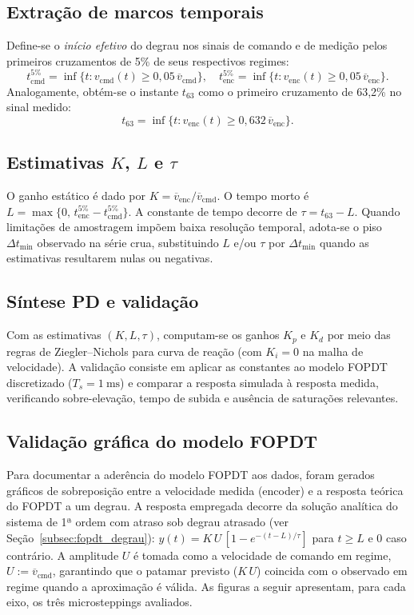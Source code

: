 \subsection{Extração de marcos temporais}\label{subsec:fopdt_marcos}
Define-se o \emph{início efetivo} do degrau nos sinais de comando e de
medição pelos primeiros cruzamentos de 5\% de seus respectivos regimes:
\begin{equation}
    t^{5\%}_{\mathrm{cmd}} = \inf\{ t: v_{\mathrm{cmd}}(t) \ge 0{,}05\,\overline v_{\mathrm{cmd}}\},\quad
    t^{5\%}_{\mathrm{enc}} = \inf\{ t: v_{\mathrm{enc}}(t) \ge 0{,}05\,\overline v_{\mathrm{enc}}\}.
\end{equation}
Analogamente, obtém-se o instante $t_{63}$ como o primeiro cruzamento de
63,2\% no sinal medido:
\begin{equation}
    t_{63} = \inf\{ t: v_{\mathrm{enc}}(t) \ge 0{,}632\,\overline v_{\mathrm{enc}}\}.
\end{equation}

\subsection{Estimativas $K$, $L$ e $\tau$}\label{subsec:fopdt_estimas}
O ganho estático é dado por $K=\overline v_{\mathrm{enc}}/\overline v_{\mathrm{cmd}}$.
O tempo morto é $L = \max\{0,\,t^{5\%}_{\mathrm{enc}} - t^{5\%}_{\mathrm{cmd}}\}$. A constante de
tempo decorre de $\tau = t_{63} - L$. Quando limitações de amostragem
impõem baixa resolução temporal, adota-se o piso $\Delta t_{\min}$
observado na série crua, substituindo $L$ e/ou $\tau$ por $\Delta t_{\min}$
quando as estimativas resultarem nulas ou negativas.

\subsection{Síntese PD e validação}\label{subsec:fopdt_valid}
Com as estimativas $(K, L, \tau)$, computam-se os ganhos $K_p$ e $K_d$ por
meio das regras de Ziegler–Nichols para curva de reação (com $K_i=0$ na
malha de velocidade). A validação consiste em aplicar as constantes ao
modelo FOPDT discretizado ($T_s=\SI{1}{\milli\second}$) e comparar a
resposta simulada à resposta medida, verificando sobre-elevação,
tempo de subida e ausência de saturações relevantes.

\subsection{Validação gráfica do modelo FOPDT}\label{subsec:fopdt_overlay}
Para documentar a aderência do modelo FOPDT aos dados, foram gerados
gráficos de sobreposição entre a velocidade medida (encoder) e a
resposta teórica do FOPDT a um degrau. A resposta empregada decorre da
solução analítica do sistema de 1ª ordem com atraso sob degrau atrasado
(ver Seção~\ref{subsec:fopdt_degrau}):
\(y(t) = K\,U\,[1 - e^{-(t-L)/\tau}]\) para $t\ge L$ e $0$ caso
contrário. A amplitude $U$ é tomada como a velocidade de comando em
regime, \(U := \overline v_{\mathrm{cmd}}\), garantindo que o patamar previsto
($K\,U$) coincida com o observado em regime quando a aproximação é
válida. As figuras a seguir apresentam, para cada eixo, os três
microsteppings avaliados.

